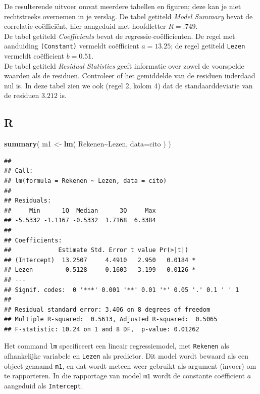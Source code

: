 \documentclass[
]{book}
\newenvironment{Shaded}{\begin{snugshade}}{\end{snugshade}}
\newcommand{\DataTypeTok}[1]{\textcolor[rgb]{0.13,0.29,0.53}{#1}}
\newcommand{\KeywordTok}[1]{\textcolor[rgb]{0.13,0.29,0.53}{\textbf{#1}}}
\newcommand{\NormalTok}[1]{#1}
\newcommand{\OperatorTok}[1]{\textcolor[rgb]{0.81,0.36,0.00}{\textbf{#1}}}
\newcommand{\StringTok}[1]{\textcolor[rgb]{0.31,0.60,0.02}{#1}}
\begin{document}
De resulterende uitvoer omvat meerdere tabellen en figuren; deze kan je
niet rechtstreeks overnemen in je verslag. De tabel getiteld \emph{Model
Summary} bevat de correlatie-coëfficiënt, hier aangeduid met hoofdletter
\(R=.749\).\\
De tabel getiteld \emph{Coefficients} bevat de regressie-coëfficienten. De
regel met aanduiding \texttt{(Constant)} vermeldt coëfficient \(a=13.25\); de
regel getiteld \texttt{Lezen} vermeldt coëfficient \(b=0.51\).\\
De tabel getiteld \emph{Residual Statistics} geeft informatie over zowel de
voorspelde waarden als de residuen. Controleer of het gemiddelde van de
residuen inderdaad nul is. In deze tabel zien we ook (regel 2, kolom 4)
dat de standaarddeviatie van de residuen \(3.212\) is.

\hypertarget{r-7}{%
\subsection{R}\label{r-7}}

\begin{Shaded}
\begin{Highlighting}[]
\KeywordTok{summary}\NormalTok{( m1 \textless{}{-}}\StringTok{ }\KeywordTok{lm}\NormalTok{( Rekenen}\OperatorTok{\textasciitilde{}}\NormalTok{Lezen, }\DataTypeTok{data=}\NormalTok{cito ) )}
\end{Highlighting}
\end{Shaded}

\begin{verbatim}
## 
## Call:
## lm(formula = Rekenen ~ Lezen, data = cito)
## 
## Residuals:
##     Min      1Q  Median      3Q     Max 
## -5.5332 -1.1167 -0.5332  1.7168  6.3384 
## 
## Coefficients:
##             Estimate Std. Error t value Pr(>|t|)  
## (Intercept)  13.2507     4.4910   2.950   0.0184 *
## Lezen         0.5128     0.1603   3.199   0.0126 *
## ---
## Signif. codes:  0 '***' 0.001 '**' 0.01 '*' 0.05 '.' 0.1 ' ' 1
## 
## Residual standard error: 3.406 on 8 degrees of freedom
## Multiple R-squared:  0.5613, Adjusted R-squared:  0.5065 
## F-statistic: 10.24 on 1 and 8 DF,  p-value: 0.01262
\end{verbatim}

Het command \texttt{lm} specificeert een lineair regressiemodel, met \texttt{Rekenen}
als afhankelijke variabele en \texttt{Lezen} als predictor. Dit model wordt
bewaard als een object genaamd \texttt{m1}, en dat wordt meteen weer gebruikt
als argument (invoer) om te rapporteren. In die rapportage van model
\texttt{m1} wordt de constante coëfficient \(a\) aangeduid als \texttt{Intercept}.
\end{document}
